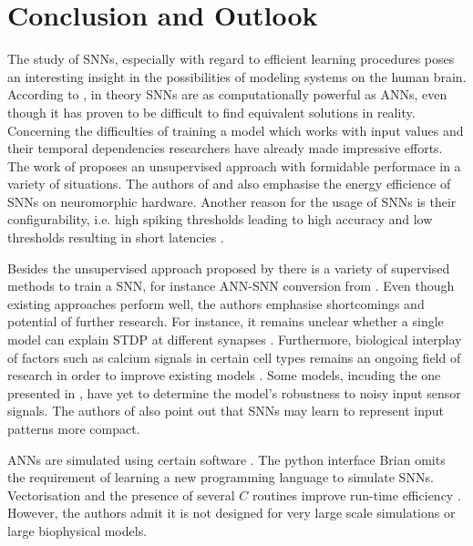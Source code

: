 \section{Conclusion and Outlook}
\label{sec:conclusion}

The study of \acp{SNN}, especially with regard to efficient learning procedures poses an interesting insight in the possibilities of modeling
systems on the human brain.
According to \cite{ANN_SNN_conversion}, in theory \acp{SNN} are as computationally powerful as \acp{ANN}, 
even though it has proven to be difficult to find equivalent solutions in reality.
Concerning the difficulties of training a model which works with input values and their temporal dependencies researchers have already made 
impressive efforts.
The work of \cite{SNN} proposes an unsupervised approach with formidable performace in a variety of situations.
The authors of \cite{SNN} and \cite{Synaptic_plasticity} also emphasise the energy efficience of \acp{SNN} on neuromorphic hardware.
Another reason for the usage of \acp{SNN} is their configurability, 
i.e. high spiking thresholds leading to high accuracy and low thresholds resulting in short latencies \cite{ANN_SNN_conversion}.

Besides the unsupervised approach proposed by \cite{SNN} there is a variety of supervised methods to train a \ac{SNN}, 
for instance \ac{ANN}-\ac{SNN} conversion from \cite{DIET_SNN}.
Even though existing approaches perform well, the authors emphasise shortcomings and potential of further research.
For instance, it remains unclear whether a single model can explain \ac{STDP} at different synapses \cite{STDP_hebbian}.
Furthermore, biological interplay of factors such as calcium signals in certain cell types remains an ongoing field of research 
in order to improve existing models \cite{STDP_hebbian}.
Some models, incuding the one presented in \cite{object_detection_SNN}, have yet to determine the model's robustness to noisy input sensor signals.
The authors of \cite{object_detection_SNN} also point out that \acp{SNN} may learn to represent input patterns more compact.

\Acp{ANN} are simulated using certain software \cite{simulation_Brian}.
The python interface Brian omits the requirement of learning a new programming language to simulate \acp{SNN}.
Vectorisation and the presence of several $C$ routines improve run-time efficiency \cite{simulation_Brian}.
However, the authors admit it is not designed for very large scale simulations or large biophysical models.

